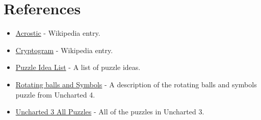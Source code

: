 \documentclass[11pt]{article}
\begin{document}
\section{References}
\label{sec:orgb5f43e7}
\begin{itemize}
\item \href{https://en.wikipedia.org/wiki/Acrostic\_(puzzle)}{Acrostic} - Wikipedia entry.
\item \href{https://en.wikipedia.org/wiki/Cryptogram}{Cryptogram} - Wikipedia entry.
\item \href{http://www.bloodandbones.com/ph12sim/types.htm}{Puzzle Idea List} - A list of puzzle ideas.
\item \href{http://www.accelerated-ideas.com/news/uncharted-4-chapter-1-2-puzzle-solution-rotating-balls.aspx}{Rotating balls and Symbols} - A description of the rotating balls and symbols puzzle from Uncharted 4.
\item \href{http://www.gameshampoo.com/magazine/articles/24/uncharted-3-all-puzzle-solutions.html}{Uncharted 3 All Puzzles} - All of the puzzles in Uncharted 3.
\end{itemize}
\end{document}
